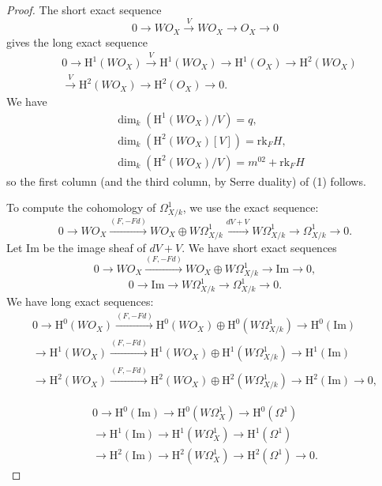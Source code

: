 \documentclass[a4paper,12pt,twoside]{report}
\newcommand{\HH}{\mathrm{H}}
\newcommand{\rk}{\mathrm{rk}}
\begin{document}
\begin{proof}
The short exact sequence \[0\rightarrow WO_X\xrightarrow{V}WO_X \rightarrow O_X\rightarrow 0\]
gives the long exact sequence
\[\begin{aligned}
     &0\rightarrow \HH^1(WO_X)\xrightarrow{V}\HH^1(WO_X)\rightarrow \HH^1(O_X)\rightarrow \HH^2(WO_X)\\
     &\xrightarrow{V} \HH^2(WO_X)\rightarrow \HH^2(O_X)\rightarrow 0.
\end{aligned}\]
We have \[\begin{aligned}
    &\dim_k(\HH^1(WO_X)/V)=q,\\
    &\dim_k( \HH^2(WO_X)[V])=\rk_FH,\\
    &\dim_k( \HH^2(WO_X)/V)=m^{02}+\rk_FH
\end{aligned}\]
so the first column (and the third column, by Serre duality) of (1) follows. 

To compute the cohomology of $\Omega^1_{X/k}$, we use the exact sequence: 
\[0\rightarrow WO_{X} \xrightarrow{(F,-Fd)}WO_X\oplus W\Omega^1_{X/k} \xrightarrow{dV+V}W\Omega^1_{X/k}\rightarrow \Omega^1_{X/k}\rightarrow 0.\]
Let $\mathrm{Im}$ be the image sheaf of $dV+V$. We have short exact sequences
\[0\rightarrow WO_{X} \xrightarrow{(F,-Fd)}WO_X\oplus W\Omega^1_{X/k} \rightarrow\mathrm{Im}\longrightarrow 0,\]
\[0\rightarrow \mathrm{Im} \rightarrow W\Omega^1_{X/k}\rightarrow \Omega^1_{X/k}\rightarrow 0.\]
We have long exact sequences: 
\[\begin{aligned}\label{Im1}
    0\rightarrow \HH^0(WO_X) \xrightarrow{(F,-Fd)} \HH^0(WO_X) \oplus \HH^0(W\Omega^1_{X/k}) \longrightarrow \HH^0(\mathrm{Im})\\
    \rightarrow \HH^1(WO_X) \xrightarrow{(F,-Fd)} \HH^1(WO_X) \oplus \HH^1(W\Omega^1_{X/k}) \longrightarrow \HH^1(\mathrm{Im})\\
    \rightarrow \HH^2(WO_X) \xrightarrow{(F,-Fd)} \HH^2(WO_X) \oplus \HH^2(W\Omega^1_{X/k}) \longrightarrow \HH^2(\mathrm{Im})\rightarrow 0,
\end{aligned}\]

\[\begin{aligned}\label{Im2}
    0\rightarrow \HH^0(\mathrm{Im}) \xrightarrow{} \HH^0(W\Omega^1_X)  \longrightarrow \HH^0(\Omega^1)\\
    \rightarrow \HH^1(\mathrm{Im}) \xrightarrow{} \HH^1(W\Omega^1_X)  \longrightarrow \HH^1(\Omega^1)\\
    \rightarrow \HH^2(\mathrm{Im}) \xrightarrow{} \HH^2(W\Omega^1_X)  \longrightarrow \HH^2(\Omega^1)\rightarrow 0. 
\end{aligned}\]


\end{proof}
\end{document}
